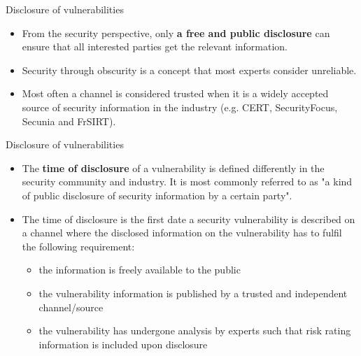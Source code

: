 \documentclass[pdf]{beamer}
\begin{document}
\begin{frame}{Disclosure of vulnerabilities}
\begin{itemize}
\item
From the security perspective, only \textbf{a free and public disclosure} can ensure that all interested parties get the relevant information. 
\item
Security through obscurity is a concept that most experts consider unreliable.
\item
Most often a channel is considered trusted when it is a widely accepted source of security information in the industry (e.g. CERT, SecurityFocus, Secunia and FrSIRT). 

\end{itemize}
\end{frame}



\begin{frame}{Disclosure of vulnerabilities}
\begin{itemize}
\item
The \textbf{time of disclosure} of a vulnerability is defined differently in the security community and industry. It is most commonly referred to as "a kind of public disclosure of security information by a certain party". 

\item
The time of disclosure is the first date a security vulnerability is described on a channel where the disclosed information on the vulnerability has to fulfil the following requirement:
\begin{itemize}
\item
the information is freely available to the public 
\item
the vulnerability information is published by a trusted and independent channel/source 
\item
the vulnerability has undergone analysis by experts such that risk rating information is included upon disclosure 
\end{itemize}
\end{itemize}
\end{frame}
\end{document}

